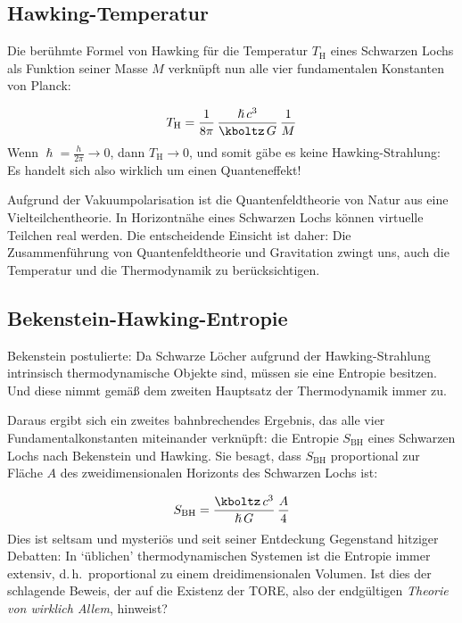 \subsection*{Hawking-Temperatur}

Die berühmte Formel von Hawking für die Temperatur $T_{\text{H}}$ eines Schwarzen Lochs als Funktion seiner Masse $M$ verknüpft nun alle vier fundamentalen Konstanten von Planck:

\begin{equation*}\label{eq:HawkingT}
  T_{\text{H}} = \frac{1}{8 \pi}\, \frac{\hslash\, c^3}{\kboltz\, G}\, \frac{1}{M}
\end{equation*}
%
Wenn $\hslash=\frac{h}{2\pi}\rightarrow0$, dann $T_\text{H}\rightarrow0$, und somit gäbe es keine Hawking-Strahlung: Es handelt sich also wirklich um einen Quanteneffekt!

Aufgrund der Vakuumpolarisation ist die Quantenfeldtheorie von Natur aus eine Vielteilchentheorie. In Horizontnähe eines Schwarzen Lochs können virtuelle Teilchen real werden. Die entscheidende Einsicht ist daher: Die Zusammenführung von Quantenfeldtheorie und Gravitation zwingt uns, auch die Temperatur und die Thermodynamik zu berücksichtigen.


\subsection*{Bekenstein-Hawking-Entropie}

Bekenstein postulierte: Da Schwarze Löcher aufgrund der Hawking-Strahlung intrinsisch thermodynamische Objekte sind, müssen sie eine Entropie besitzen. Und diese nimmt gemäß dem zweiten Hauptsatz der Thermodynamik immer zu.

Daraus ergibt sich ein zweites bahnbrechendes Ergebnis, das alle vier Fundamentalkonstanten miteinander verknüpft: die Entropie $S_{\text{BH}}$ eines Schwarzen Lochs nach Bekenstein und Hawking. Sie besagt, dass $S_{\text{BH}}$ proportional zur Fläche $A$ des zweidimensionalen Horizonts des Schwarzen Lochs ist:

\begin{equation*}
  S_{\text{BH}} = \frac{\kboltz\, c^3}{\hslash\, G}\, \frac{A}{4}
\end{equation*}
%
Dies ist seltsam und mysteriös und seit seiner Entdeckung Gegenstand hitziger Debatten: In \enquote*{üblichen} thermodynamischen Systemen ist die Entropie immer extensiv, d.\,h.\ proportional zu einem dreidimensionalen Volumen. Ist dies der schlagende Beweis, der auf die Existenz der TORE, also der endgültigen \emph{Theorie von wirklich Allem}, hinweist?
